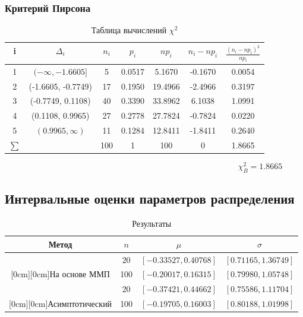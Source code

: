 \documentclass[a4]{article}
\begin{document}
\subsubsection{Критерий Пирсона}
\begin{table}[H]
\caption{Таблица вычислений $\chi^2$}
\label{tab:my_label1}
\begin{center}
\vspace{5mm}
\begin{tabular}{|c|c|c|c|c|c|c|}
\hline
 i & $\Delta_i$ & $n_i$ & $p_i$ & $np_i$ & $n_i-np_i$ & $\frac{(n_i-np_i)^2}{np_i}$\\
\hline
1&	 $(-\infty, -1.6605]$ &	5  &	 0.0517	& 5.1670 &	 -0.1670 &	 0.0054\\
\hline
2&	(-1.6605, -0.7749)&	17&	 0.1950&	 19.4966&	 -2.4966&	 0.3197\\
\hline
3& (-0.7749, 0.1108)&	40&	 0.3390&	 33.8962& 6.1038&	 1.0991\\
\hline
4&	(0.1108, 0.9965)&	27&	 0.2778&	 27.7824&	 -0.7824&	 0.0220\\
\hline
5& $(0.9965, \infty)$&	11&	 0.1284&	 12.8411&	 -1.8411&	 0.2640\\
\hline
$\sum$&&		100&	1&	100&0&1.8665	\\

\hline
\end{tabular}
\end{center}
\end{table}

$$\chi_B^2= 1.8665$$

\subsection{Интервальные оценки параметров распределения}

\begin{table}[H]
\caption{Результаты}
\label{tab:my_label1}
\begin{center}
\vspace{5mm}
\begin{tabular}{|c|c|c|c|}
\hline
Метод & $n$&$\mu$&$\sigma$\\
\hline
&$20$&	$[-0.33527, 0.40768]$&		$[0.71165, 1.36749]$ \\
\cline{2-4}
\raisebox{1.5ex}[0cm][0cm]{На основе ММП}&100&	$[-0.20017, 0.16315]$&		$[0.79980, 1.05748]$\\
\hline
&20&	$[-0.37421, 0.44662]$&		$[0.75586, 1.11704]$ \\
\cline{2-4}
\raisebox{1.5ex}[0cm][0cm]{Асимптотический}&100	&$[-0.19705, 0.16003]$&	$[0.80188, 1.01998]$\\
\hline
\end{tabular}
\end{center}
\end{table}
\end{document}
